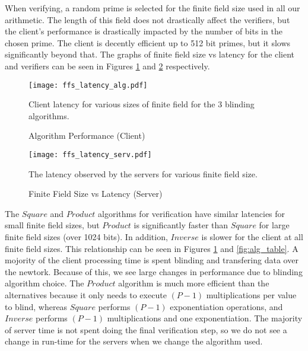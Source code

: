 \documentclass[conference]{IEEEtran}
\begin{document}
When verifying, a random prime is selected for the finite field size used in all our arithmetic. The length of this field does not drastically affect the verifiers, but the client's performance is drastically impacted by the number of bits in the chosen prime. The client is decently efficient up to 512 bit primes, but it slows significantly beyond that. The graphs of finite field size vs latency for the client and verifiers can be seen in Figures \ref{fig:alg_latency} and \ref{fig:ffs_server} respectively.\\

\begin{figure}
\texttt{[image: ffs\_latency\_alg.pdf]}\\
\caption{Algorithm Performance (Client)}
\label{fig:alg_latency}
\medskip
\small
Client latency for various sizes of finite field for the 3 blinding algorithms.
\end{figure}
\begin{figure}
\texttt{[image: ffs\_latency\_serv.pdf]}\\
\caption{Finite Field Size vs Latency (Server)}
\label{fig:ffs_server}
\medskip
\small
The latency observed by the servers for various finite field size.
\end{figure}

The $Square$ and $Product$ algorithms for verification have similar latencies for small finite field sizes, but $Product$ is significantly faster than $Square$ for large finite field sizes (over 1024 bits). In addition, $Inverse$ is slower for the client at all finite field sizes. This relationship can be seen in Figures \ref{fig:alg_latency} and \ref{fig:alg_table}. A mojority of the client processing time is spent blinding and transfering data over the newtork. Because of this, we see large changes in performance due to blinding algorithm choice. The $Product$ algorithm is much more efficient than the alternatives because it only needs to execute $(P-1)$ multiplications per value to blind, whereas $Square$ performs $(P-1)$ exponentiation operations, and $Inverse$ performs $(P-1)$ multiplications and one exponentiation. The majority of server time is not spent doing the final verification step, so we do not see a change in run-time for the servers when we change the algorithm used.\\
\end{document}
